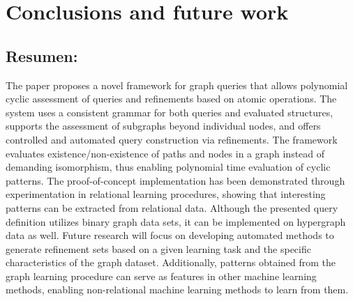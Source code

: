 \documentclass{article}%
\begin{document}
%
\clearpage%
\section{Conclusions and future work}%
\label{sec:Conclusionsandfuturework}%
\subsection{Resumen:}%
\label{subsec:Resumen}%
The paper proposes a novel framework for graph queries that allows polynomial cyclic assessment of queries and refinements based on atomic operations. The system uses a consistent grammar for both queries and evaluated structures, supports the assessment of subgraphs beyond individual nodes, and offers controlled and automated query construction via refinements. The framework evaluates existence/non{-}existence of paths and nodes in a graph instead of demanding isomorphism, thus enabling polynomial time evaluation of cyclic patterns. The proof{-}of{-}concept implementation has been demonstrated through experimentation in relational learning procedures, showing that interesting patterns can be extracted from relational data. Although the presented query definition utilizes binary graph data sets, it can be implemented on hypergraph data as well. Future research will focus on developing automated methods to generate refinement sets based on a given learning task and the specific characteristics of the graph dataset. Additionally, patterns obtained from the graph learning procedure can serve as features in other machine learning methods, enabling non{-}relational machine learning methods to learn from them.

%
\end{document}
